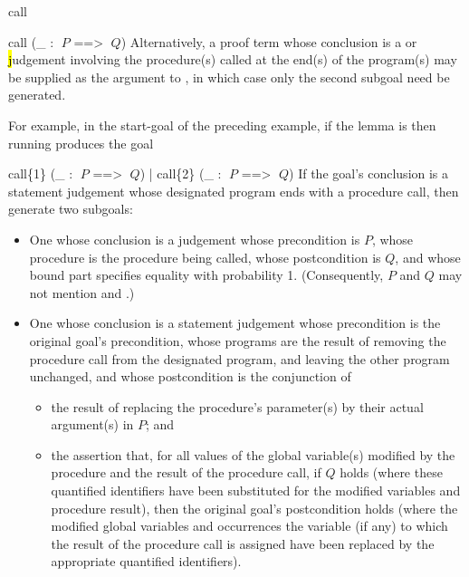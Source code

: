 \begin{tactic}{call}
\begin{tsyntax}{call (_ : $\;P$ ==> $\;Q$)}
  \bigskip
  Alternatively, a proof term whose conclusion is a \prhl or
  \hl judgement involving the procedure(s) called at the
  end(s) of the program(s) may be supplied as the argument to
  , in which case only the second subgoal need be
  generated.

  \medskip
  For example, in the start-goal of the preceding example,
  if the lemma  is
  then running
   produces the
  goal 
  \end{tsyntax}

  \begin{tsyntax}{call\{1\} (_ : $\;P$ ==> $\;Q$) | call\{2\} (_ : $\;P$ ==> $\;Q$)}
    If the goal's conclusion is a \prhl statement judgement whose
    designated program ends with a procedure call, then generate two
    subgoals:
  \begin{itemize}
  \item One whose conclusion is a \phl judgement whose precondition is
    $P$, whose procedure is the procedure being called, whose
    postcondition is $Q$, and whose bound part specifies equality with
    probability 1.
    (Consequently, $P$ and $Q$ may not mention  and
    .)

  \item One whose conclusion is a \prhl statement judgement whose
    precondition is the original goal's precondition, whose programs
    are the result of removing the procedure call from the designated
    program, and leaving the other program unchanged, and whose
    postcondition is the conjunction of
    \begin{itemize}
    \item the result of replacing the procedure's
      parameter(s) by their actual argument(s) in $P$; and

    \item the assertion that, for all values of the global variable(s)
      modified by the procedure and the result of the procedure call,
      if $Q$ holds (where these quantified identifiers have been
      substituted for the modified variables and procedure result),
      then the original goal's postcondition holds (where the modified
      global variables and occurrences the variable (if any) to which
      the result of the procedure call is assigned have been replaced
      by the appropriate quantified identifiers).
    \end{itemize}
  \end{itemize}


\end{tsyntax}
\end{tactic}
